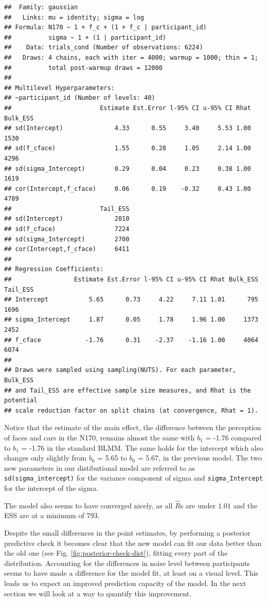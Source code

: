 \documentclass[
  doc,12pt,floatsintext]{apa7}
\begin{document}
\begin{verbatim}
##  Family: gaussian 
##   Links: mu = identity; sigma = log 
## Formula: N170 ~ 1 + f_c + (1 + f_c | participant_id) 
##          sigma ~ 1 + (1 | participant_id)
##    Data: trials_cond (Number of observations: 6224) 
##   Draws: 4 chains, each with iter = 4000; warmup = 1000; thin = 1;
##          total post-warmup draws = 12000
## 
## Multilevel Hyperparameters:
## ~participant_id (Number of levels: 40) 
##                        Estimate Est.Error l-95% CI u-95% CI Rhat Bulk_ESS
## sd(Intercept)              4.33      0.55     3.40     5.53 1.00     1530
## sd(f_cface)                1.55      0.28     1.05     2.14 1.00     4296
## sd(sigma_Intercept)        0.29      0.04     0.23     0.38 1.00     1619
## cor(Intercept,f_cface)     0.06      0.19    -0.32     0.43 1.00     4789
##                        Tail_ESS
## sd(Intercept)              2810
## sd(f_cface)                7224
## sd(sigma_Intercept)        2700
## cor(Intercept,f_cface)     6411
## 
## Regression Coefficients:
##                 Estimate Est.Error l-95% CI u-95% CI Rhat Bulk_ESS Tail_ESS
## Intercept           5.65      0.73     4.22     7.11 1.01      795     1696
## sigma_Intercept     1.87      0.05     1.78     1.96 1.00     1373     2452
## f_cface            -1.76      0.31    -2.37    -1.16 1.00     4064     6074
## 
## Draws were sampled using sampling(NUTS). For each parameter, Bulk_ESS
## and Tail_ESS are effective sample size measures, and Rhat is the potential
## scale reduction factor on split chains (at convergence, Rhat = 1).
\end{verbatim}

\normalsize

Notice that the estimate of the main effect, the difference between the perception of faces and cars in the N170, remains almost the same with \(b_1\) = -1.76 compared to \(b_1\) = -1.76 in the standard BLMM. The same holds for the intercept which also changes only slightly from \(b_0\) = 5.65 to \(b_0\) = 5.67, in the previous model. The two new parameters in our distibutional model are referred to as \texttt{sd(sigma\_intercept)} for the variance component of sigma and \texttt{sigma\_Intercept} for the intercept of the sigma.

The model also seems to have converged nicely, as all \(\hat{R}\)s are under \(1.01\) and the ESS are at a minimum of 793.

Despite the small differences in the point estimates, by performing a posterior predictive check it becomes clear that the new model can fit our data better than the old one (see Fig. \ref{fig:posterior-check-dist}), fitting every part of the distribution. Accounting for the differences in noise level between participants seems to have made a difference for the model fit, at least on a visual level. This leads us to expect an improved prediction capacity of the model. In the next section we will look at a way to quantify this improvement.
\end{document}
